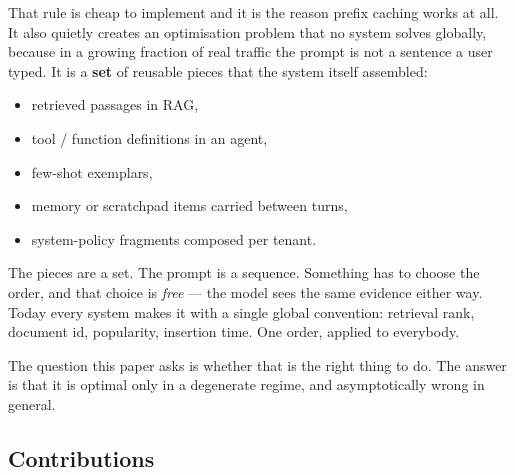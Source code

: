 \documentclass[11pt]{article}
\theoremstyle{plain}
\begin{document}
That rule is cheap to implement and it is the reason prefix caching works at all. It also quietly creates an optimisation problem that no system solves globally, because in a growing fraction of real traffic the prompt is not a sentence a user typed. It is a \textbf{set} of reusable pieces that the system itself assembled:

\begin{itemize}
\item retrieved passages in RAG,
\item tool / function definitions in an agent,
\item few-shot exemplars,
\item memory or scratchpad items carried between turns,
\item system-policy fragments composed per tenant.
\end{itemize}

The pieces are a set. The prompt is a sequence. Something has to choose the order, and that choice is \emph{free} --- the model sees the same evidence either way. Today every system makes it with a single global convention: retrieval rank, document id, popularity, insertion time. One order, applied to everybody.

The question this paper asks is whether that is the right thing to do. The answer is that it is optimal only in a degenerate regime, and asymptotically wrong in general.

\subsection{Contributions}
\end{document}
